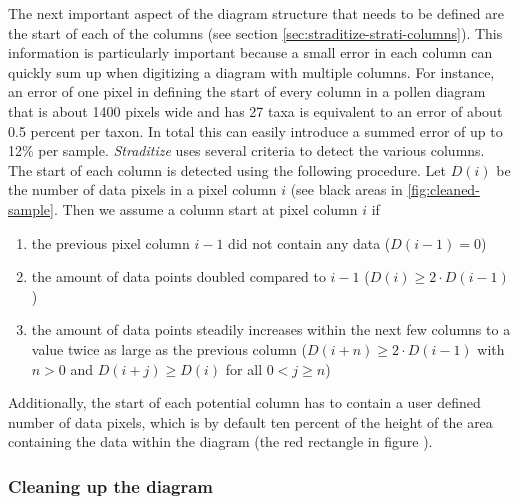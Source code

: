 \begin{refsection}
The next important aspect of the diagram structure that needs to be defined are the start of each of the columns (see section \ref{sec:straditize-strati-columns}). This information is particularly important because a small error in each column can quickly sum up when digitizing a diagram with multiple columns. For instance, an error of one pixel in defining the start of every column in a pollen diagram that is about 1400 pixels wide and has 27 taxa is equivalent to an error of about 0.5 percent per taxon. In total this can easily introduce a summed error of up to 12\% per sample. 
\emph{Straditize} uses several criteria to detect the various columns. The start of each column is detected using the following procedure. Let $D(i)$ be the number of data pixels in a pixel column $i$ (see black areas in \ref{fig:cleaned-sample}. Then we assume a column start at pixel column $i$ if

\begin{enumerate}
	\item the previous pixel column $i-1$ did not contain any data ($D(i-1) = 0$)
	\item the amount of data points doubled compared to $i-1$ ($D(i) \geq 2\cdot D(i-1)$)
	\item the amount of data points steadily increases within the next few columns to a value twice as large as the previous column ($D(i+n) \geq 2\cdot D(i-1)$ with $n>0$ and $D(i+j) \geq D(i)$ for all $0 < j \geq n$)
\end{enumerate}

Additionally, the start of each potential column has to contain a user defined number of data pixels, which is by default ten percent of the height of the area containing the data within the diagram (the red rectangle in figure \samplediagram).

\subsubsection{Cleaning up the diagram}  \label{sec:straditize-cleaning}


\end{refsection}
